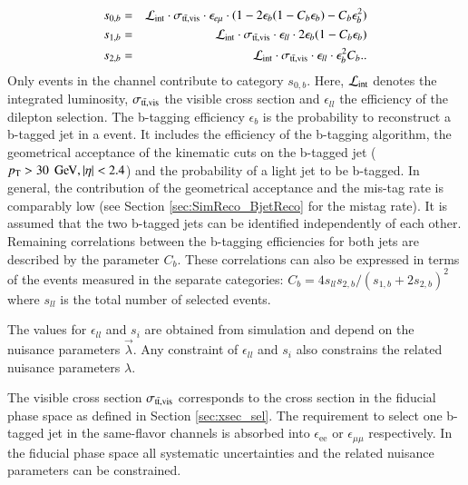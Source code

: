 \begin{eqnarray}
s_{0,b}  &=& \mathcal{L}_{\rm int} \cdot \sigma_{\mathrm{t}\bar{\mathrm{t}},\mathrm{vis}}\cdot \epsilon_{e\mu} \cdot (1-2\epsilon_b(1-C_b\epsilon_b)-C_b\epsilon_b^2) \\
s_{1,b}  &=& \mathcal{L}_{\rm int} \cdot \sigma_{\mathrm{t}\bar{\mathrm{t}},\mathrm{vis}} \cdot \epsilon_{ll} \cdot 2 \epsilon_b(1-C_b\epsilon_b) \\
s_{2,b}  &=& \mathcal{L}_{\rm int} \cdot \sigma_{\mathrm{t}\bar{\mathrm{t}},\mathrm{vis}} \cdot \epsilon_{ll} \cdot   \epsilon_b^2 C_b.
\label{eq:xsec_nb}.
\end{eqnarray}
Only events in the \emu channel contribute to category $s_{0,b}$.
Here, $\mathcal{L}_{\rm int}$ denotes the integrated luminosity, $\sigma_{\mathrm{t}\bar{\mathrm{t}},\mathrm{vis}}$ the visible \ttbar cross section and $\epsilon_{ll}$ the efficiency of the dilepton selection.
The b-tagging efficiency $\epsilon_b$ is the probability to reconstruct a b-tagged jet in a \ttbar event. It includes the efficiency of the b-tagging algorithm, the geometrical acceptance of the kinematic cuts on the b-tagged jet ($p_{\mathrm{T}} > 30\; \,\text{Ge\hspace{-.08em}V}, |\eta|<2.4$) and the probability of a light jet to be b-tagged. In general, the contribution of the geometrical acceptance and the mis-tag rate is comparably low (see Section \ref{sec:SimReco_BjetReco} for the mistag rate).
It is assumed that the two b-tagged jets can be identified independently of each other. Remaining correlations between the b-tagging efficiencies for both jets are described by the parameter $C_b$. These correlations can also be expressed in terms of the events measured in the separate categories: $C_b=4s_{ll}s_{2,b}/(s_{1,b}+2s_{2,b})^2$ where $s_{ll}$ is the total number of selected \ttbar events. 

The values for $\epsilon_{ll}$ and $s_{i}$ are obtained from simulation and depend on the nuisance parameters $\vec{\lambda}$. Any constraint of $\epsilon_{ll}$ and $s_{i}$ also constrains the related nuisance parameters $\lambda$.

The visible cross section $\sigma_{\mathrm{t}\bar{\mathrm{t}},\mathrm{vis}}$ corresponds to the cross section in the fiducial phase space as defined in Section \ref{sec:xsec_sel}. The requirement to select one b-tagged jet in the same-flavor channels is absorbed into $\epsilon_{\mathrm{ee}}$ or $\epsilon_{\mu\mu}$ respectively.
In the fiducial phase space all systematic uncertainties and the related nuisance parameters can be constrained.

